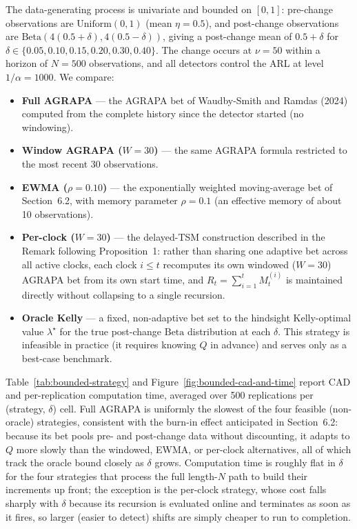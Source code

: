 The data-generating process is univariate and bounded on $[0,1]$: pre-change observations are
$\mathrm{Uniform}(0,1)$ (mean $\eta = 0.5$), and post-change observations are
$\mathrm{Beta}(4(0.5+\delta), 4(0.5-\delta))$, giving a post-change mean of $0.5 + \delta$ for
$\delta \in \{0.05, 0.10, 0.15, 0.20, 0.30, 0.40\}$. The change occurs at $\nu = 50$ within a
horizon of $N = 500$ observations, and all detectors control the ARL at level
$1/\alpha = 1000$. We compare:
\begin{itemize}
  \item \textbf{Full AGRAPA} --- the AGRAPA bet of Waudby-Smith and Ramdas (2024) computed from
    the complete history since the detector started (no windowing).
  \item \textbf{Window AGRAPA ($W=30$)} --- the same AGRAPA formula restricted to the most recent
    30 observations.
  \item \textbf{EWMA ($\rho=0.10$)} --- the exponentially weighted moving-average bet of
    Section~6.2, with memory parameter $\rho = 0.1$ (an effective memory of about 10
    observations).
  \item \textbf{Per-clock ($W=30$)} --- the delayed-TSM construction described in the Remark
    following Proposition~1: rather than sharing one adaptive bet across all active clocks, each
    clock $i \le t$ recomputes its own windowed ($W=30$) AGRAPA bet from its own start time, and
    $R_t = \sum_{i=1}^t M_t^{(i)}$ is maintained directly without collapsing to a single recursion.
  \item \textbf{Oracle Kelly} --- a fixed, non-adaptive bet set to the hindsight Kelly-optimal
    value $\lambda^\star$ for the true post-change $\mathrm{Beta}$ distribution at each $\delta$.
    This strategy is infeasible in practice (it requires knowing $Q$ in advance) and serves only
    as a best-case benchmark.
\end{itemize}
Table~\ref{tab:bounded-strategy} and Figure~\ref{fig:bounded-cad-and-time} report CAD and
per-replication computation time, averaged over 500 replications per (strategy, $\delta$) cell.
Full AGRAPA is uniformly the slowest of the four feasible (non-oracle) strategies, consistent with
the burn-in effect anticipated in Section~6.2: because its bet pools pre- and post-change data
without discounting, it adapts to $Q$ more slowly than the windowed, EWMA, or per-clock
alternatives, all of which track the oracle bound closely as $\delta$ grows. Computation time is
roughly flat in $\delta$ for the four strategies that process the full length-$N$ path to build
their increments up front; the exception is the per-clock strategy, whose cost falls sharply with
$\delta$ because its recursion is evaluated online and terminates as soon as it fires, so larger
(easier to detect) shifts are simply cheaper to run to completion.


